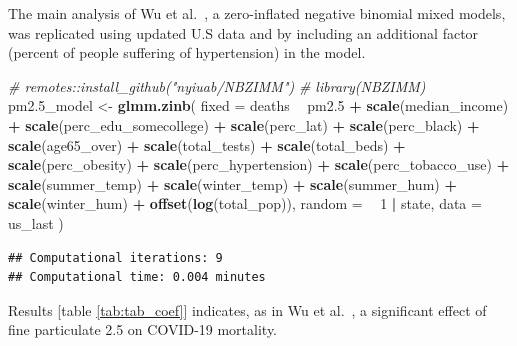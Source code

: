 \documentclass[12pt,halfline,a4paper,]{ouparticle}
\newenvironment{Shaded}{\begin{snugshade}}{\end{snugshade}}
\newcommand{\CommentTok}[1]{\textcolor[rgb]{0.56,0.35,0.01}{\textit{#1}}}
\newcommand{\DataTypeTok}[1]{\textcolor[rgb]{0.13,0.29,0.53}{#1}}
\newcommand{\DecValTok}[1]{\textcolor[rgb]{0.00,0.00,0.81}{#1}}
\newcommand{\FloatTok}[1]{\textcolor[rgb]{0.00,0.00,0.81}{#1}}
\newcommand{\KeywordTok}[1]{\textcolor[rgb]{0.13,0.29,0.53}{\textbf{#1}}}
\newcommand{\NormalTok}[1]{#1}
\newcommand{\OperatorTok}[1]{\textcolor[rgb]{0.81,0.36,0.00}{\textbf{#1}}}
\newcommand{\StringTok}[1]{\textcolor[rgb]{0.31,0.60,0.02}{#1}}
\begin{document}
The main analysis of Wu et al.~\citeyearpar{wu2020m}, a zero-inflated
negative binomial mixed models, was replicated using updated U.S data
and by including an additional factor (percent of people suffering of
hypertension) in the model.

\begin{Shaded}
\begin{Highlighting}[]
\CommentTok{# remotes::install_github("nyiuab/NBZIMM")}
\CommentTok{# library(NBZIMM)}
\NormalTok{pm2}\FloatTok{.5}\NormalTok{_model <-}\StringTok{ }\KeywordTok{glmm.zinb}\NormalTok{(}
  \DataTypeTok{fixed =}
\NormalTok{    deaths }\OperatorTok{~}
\StringTok{    }\NormalTok{pm2}\FloatTok{.5} \OperatorTok{+}
\StringTok{      }\KeywordTok{scale}\NormalTok{(median_income) }\OperatorTok{+}
\StringTok{      }\KeywordTok{scale}\NormalTok{(perc_edu_somecollege) }\OperatorTok{+}
\StringTok{      }\KeywordTok{scale}\NormalTok{(perc_lat) }\OperatorTok{+}
\StringTok{      }\KeywordTok{scale}\NormalTok{(perc_black) }\OperatorTok{+}
\StringTok{      }\KeywordTok{scale}\NormalTok{(age65_over) }\OperatorTok{+}
\StringTok{      }\KeywordTok{scale}\NormalTok{(total_tests) }\OperatorTok{+}
\StringTok{      }\KeywordTok{scale}\NormalTok{(total_beds) }\OperatorTok{+}
\StringTok{      }\KeywordTok{scale}\NormalTok{(perc_obesity) }\OperatorTok{+}
\StringTok{      }\KeywordTok{scale}\NormalTok{(perc_hypertension) }\OperatorTok{+}
\StringTok{      }\KeywordTok{scale}\NormalTok{(perc_tobacco_use) }\OperatorTok{+}
\StringTok{      }\KeywordTok{scale}\NormalTok{(summer_temp) }\OperatorTok{+}
\StringTok{      }\KeywordTok{scale}\NormalTok{(winter_temp) }\OperatorTok{+}
\StringTok{      }\KeywordTok{scale}\NormalTok{(summer_hum) }\OperatorTok{+}
\StringTok{      }\KeywordTok{scale}\NormalTok{(winter_hum) }\OperatorTok{+}
\StringTok{      }\KeywordTok{offset}\NormalTok{(}\KeywordTok{log}\NormalTok{(total_pop)),}
  \DataTypeTok{random =} \OperatorTok{~}\StringTok{ }\DecValTok{1} \OperatorTok{|}\StringTok{ }\NormalTok{state,}
  \DataTypeTok{data =}\NormalTok{ us_last}
\NormalTok{)}
\end{Highlighting}
\end{Shaded}

\begin{verbatim}
## Computational iterations: 9 
## Computational time: 0.004 minutes
\end{verbatim}

Results {[}table \ref{tab:tab_coef}{]} indicates, as in Wu et
al.~\citeyearpar{wu2020m}, a significant effect of fine particulate 2.5
on COVID-19 mortality.
\end{document}
